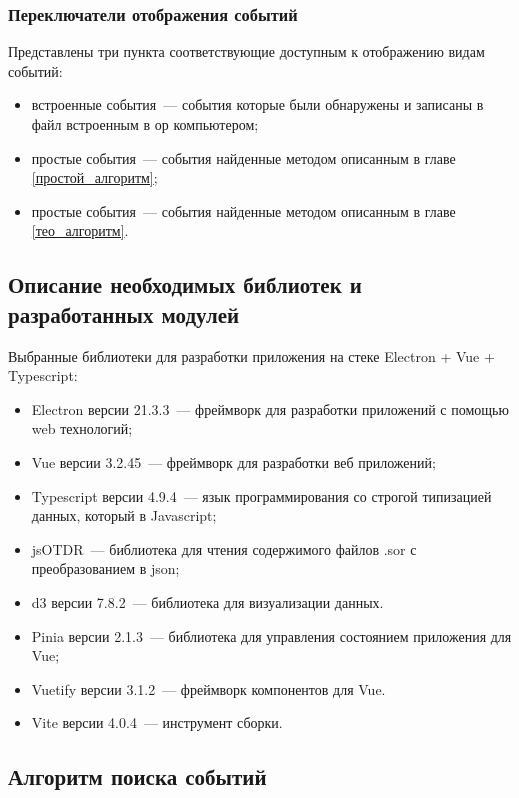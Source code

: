 \subsubsection{Переключатели отображения событий}

Представлены три пункта соответствующие доступным к отображению видам событий:
\begin{itemize}
  \item встроенные события~--- события которые были обнаружены и записаны в файл встроенным в \acrshort{ор} компьютером;
  \item простые события~--- события найденные методом описанным в главе \ref{простой_алгоритм};
  \item простые события~--- события найденные методом описанным в главе \ref{тео_алгоритм}.
\end{itemize}

\subsection{Описание необходимых библиотек и разработанных модулей}

Выбранные библиотеки для разработки приложения на стеке Electron + Vue + Typescript:

\begin{itemize}
  \item Electron версии 21.3.3~--- \gls{фреймворк} для разработки приложений с помощью web технологий;
  \item Vue версии 3.2.45~--- \gls{фреймворк} для разработки  веб приложений;
  \item Typescript версии 4.9.4~--- язык программирования со строгой типизацией данных, который  в Javascript;
  \item jsOTDR~--- библиотека для чтения содержимого файлов .sor с преобразованием в json;
  \item d3 версии 7.8.2~--- библиотека для визуализации данных.
  \item Pinia версии 2.1.3~--- библиотека для управления состоянием приложения для Vue;
  \item Vuetify версии 3.1.2~--- \gls{фреймворк} компонентов для Vue.
  \item Vite версии 4.0.4~--- инструмент сборки.
\end{itemize}

\subsection{Алгоритм поиска событий}

